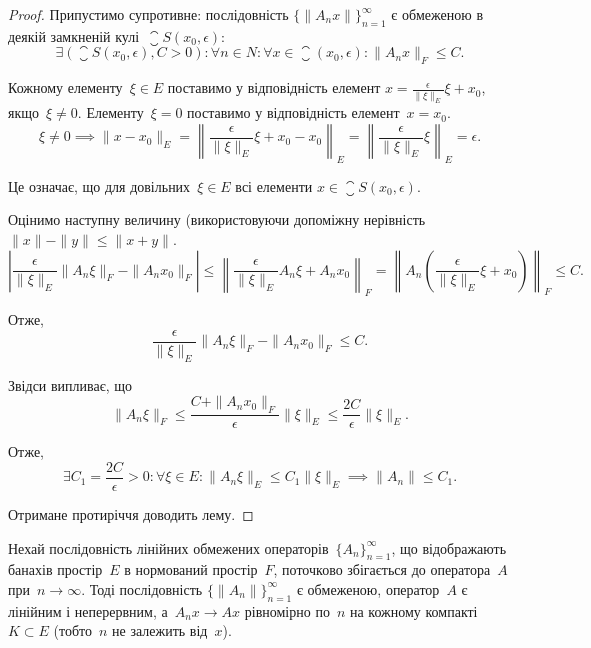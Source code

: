 \begin{proof}
Припустимо супротивне: послідовність
$\{\|A_n x\|\}_{n = 1}^\infty$
є обмеженою в деякій замкненій кулі~$\closure S(x_0, \epsilon)$:
\begin{equation*}
    \exists (\closure S(x_0, \epsilon), C > 0):
    \forall n \in N:
    \forall x \in \closure(x_0, \epsilon):
    \|A_n x\|_F \le C.
\end{equation*}

Кожному елементу~$\xi \in E$ поставимо у відповідність елемент
$x = \frac{\epsilon}{\|\xi\|_E} \xi + x_0$, якщо~$\xi \ne 0$.
Елементу~$\xi = 0$ поставимо у відповідність елемент~$x = x_0$.
\begin{equation*}
    \xi \ne 0 \implies
    \|x - x_0\|_E =
    \left\| \frac{\epsilon}{\|\xi\|_E} \xi + x_0 - x_0 \right\|_E =
    \left\| \frac{\epsilon}{\|\xi\|_E} \xi \right\|_E =
    \epsilon.
\end{equation*}

Це означає, що для довільних~$\xi \in E$ всі елементи
$x \in \closure S(x_0, \epsilon)$.

Оцінимо наступну величину (використовуючи допоміжну
нерівність~$\|x\| - \|y\| \le \|x + y\|$.
\begin{equation}
    \left| \frac{\epsilon}{\|\xi\|_E} \|A_n \xi\|_F - \|A_n x_0\|_F \right| \le
    \left\| \frac{\epsilon}{\|\xi\|_E} A_n \xi + A_n x_0 \right\|_F =
    \left\| A_n \left( \frac{\epsilon}{\|\xi\|_E} \xi + x_0 \right) \right\|_F \le C.
\end{equation}

Отже,
\begin{equation*}
    \frac{\epsilon}{\|\xi\|_E} \|A_n \xi\|_F - \|A_n x_0\|_F \le C.
\end{equation*}

Звідси випливає, що
\begin{equation*}
    \|A_n \xi\|_F \le
    \frac{C + \|A_n x_0\|_F}{\epsilon} \|\xi\|_E \le
    \frac{2 C}{\epsilon} \|\xi\|_E.
\end{equation*}

Отже,
\begin{equation*}
    \exists C_1 = \frac{2 C}{\epsilon} > 0:
    \forall \xi \in E:
    \|A_n \xi\|_E \le C_1 \|\xi\|_E \implies
    \|A_n\| \le C_1.
\end{equation*}

Отримане протиріччя доводить лему.
\end{proof}

\begin{theorem}
Нехай послідовність
лінійних обмежених операторів~$\{A_n\}_{n = 1}^\infty$, що відображають
банахів простір~$E$ в нормований простір~$F$, поточково
збігається до оператора~$A$ при~$n \to \infty$. Тоді послідовність
$\{\|A_n\|\}_{n = 1}^\infty$ є обмеженою, оператор~$A$ є лінійним і
неперервним, а~$A_n x \to A x$ рівномірно по~$n$ на кожному
компакті~$K \subset E$ (тобто~$n$ не залежить від~$x$).
\end{theorem}

